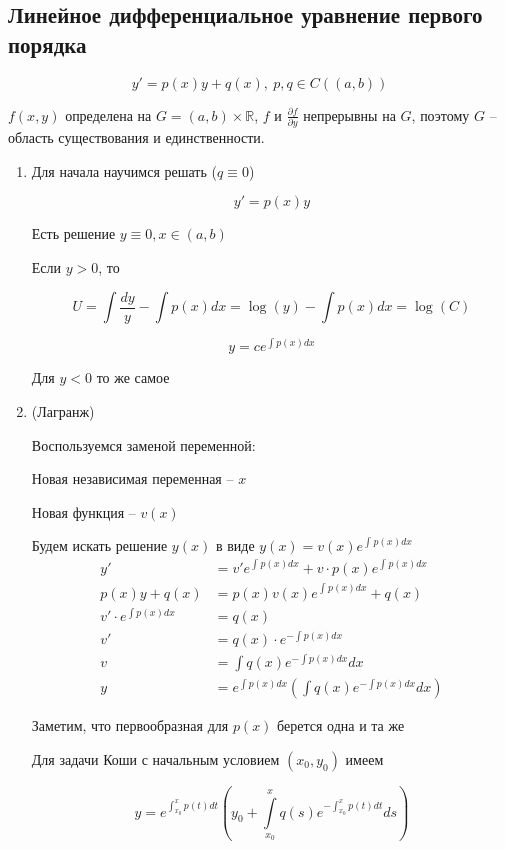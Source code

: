 \documentclass[a4paper]{article}
\theoremstyle{indented}
\theoremstyle{definition}
\theoremstyle{remark}
\begin{document}
\subsection{Линейное дифференциальное уравнение первого порядка}

\[y' = p(x) y + q(x), \ p,q \in C((a,b))\]

$f(x,y)$ определена на $G = (a,b) \times \mathbb{R} $, $f$ и $\frac{\partial f}{\partial y}$ непрерывны на $G$, поэтому $G$ -- область существования и единственности.


\begin{enumerate}
\item Для начала научимся решать  ($q \equiv 0$)

  \[y' = p(x) y\]

  Есть решение $y \equiv 0, x \in (a,b)$


  Если $y > 0$, то

  \[U = \int \frac{dy}{y} - \int p(x) dx = \log (y) - \int p(x) dx = \log(C)
  \]

  \[y = c e^{\int p(x) dx}\]

  Для $y < 0$ то же самое


\item {} (Лагранж)

  Воспользуемся заменой переменной:

  Новая независимая переменная -- $x$

  Новая функция -- $v(x)$

  Будем искать решение $y(x)$ в виде $y(x) = v(x) e^{\int_{}^{}p(x) dx}$
  \begin{equation*}
    \begin{aligned}
      y'  & = v' e^{\int_{}^{}p(x) dx} + v \cdot p(x) e^{\int_{}^{}p(x) dx} \\
      p(x)y + q(x) & =  p(x) v(x) e^{\int_{}^{}p(x) dx} + q(x) \\
      v' \cdot e^{\int p(x) dx} & = q(x) \\
      v'& = q(x) \cdot e^{-\int p(x) dx} \\
      v  &= \int q(x) e^{-\int p(x) dx} dx \\
      y & = e^{\int p(x) dx} (\int q(x) e^{-\int p(x) dx} dx)
  \end{aligned}
\end{equation*}

Заметим, что первообразная для $p(x)$ берется одна и та же

Для задачи Коши с начальным условием $(x_0,y_0)$ имеем


\[y  = e^{\int_{x_0}^x p(t) dt} (y_0 + \int\limits_{x_0}^x q(s) e^{-\int_{x_0}^x p(t) dt} ds)\]

\end{enumerate}
\end{document}
